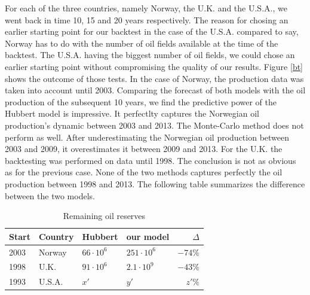 \documentclass[twoside]{article}
\begin{document}
\begin{multicols}{2}
For each of the three countries, namely Norway, the U.K. and the U.S.A., we went back in time 10, 15 and 20 years respectively. The reason for chosing an earlier starting point for our backtest in the case of the U.S.A. compared to say, Norway has to do with the number of oil fields available at the time of the backtest. The U.S.A. having the biggest number of oil fields, we could chose an earlier starting point without compromising the quality of our results. Figure \ref{bt} shows the outcome of those tests. In the case of Norway, the production data was taken into account until 2003. Comparing the forecast of both models with the oil production of the subsequent 10 years, we find the predictive power of the Hubbert model is impressive. It perfectlty captures the Norwegian oil production's dynamic between 2003 and 2013. The Monte-Carlo method does not perform as well. After underestimating the Norwegian oil production between 2003 and 2009, it overestimates it between 2009 and 2013. For the U.K. the backtesting was performed on data until 1998. The conclusion is not as obvious as for the previous case. None of the two methods captures perfectly the oil production between 1998 and 2013. The following table summarizes the difference between the two models.

\begin{table}[H]
\caption{Remaining oil reserves}
\centering
\begin{tabular}{llllr}
Start & Country & Hubbert & our model & $\Delta$ \\
\midrule
2003 & Norway & $66 \cdot 10^6$ & $251 \cdot 10^6$ & $-74\%$\\
1998 & U.K. & $91 \cdot 10^6$ & $2.1 \cdot 10^9$ & $-43\%$ \\
1993 & U.S.A. & $x'$ & $y'$ & $z'\%$ \\
\bottomrule
\end{tabular}
\end{table}


\end{multicols}
\end{document}
